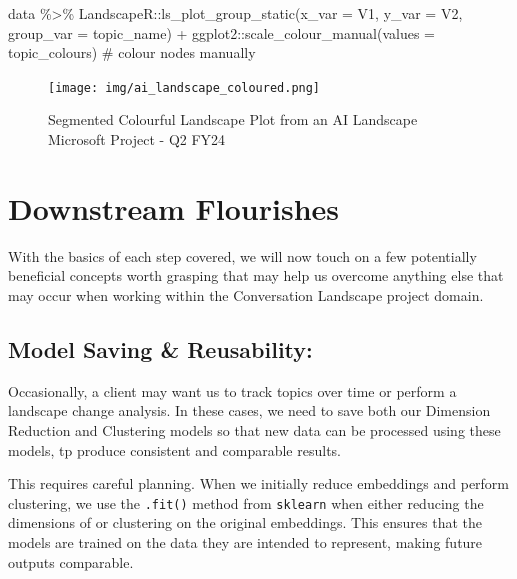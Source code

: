 \documentclass[
  letterpaper,
  DIV=11,
  numbers=noendperiod]{scrreprt}
\newenvironment{Shaded}{\begin{snugshade}}{\end{snugshade}}
\newcommand{\AttributeTok}[1]{\textcolor[rgb]{0.40,0.45,0.13}{#1}}
\newcommand{\CommentTok}[1]{\textcolor[rgb]{0.37,0.37,0.37}{#1}}
\newcommand{\FunctionTok}[1]{\textcolor[rgb]{0.28,0.35,0.67}{#1}}
\newcommand{\NormalTok}[1]{\textcolor[rgb]{0.00,0.23,0.31}{#1}}
\newcommand{\SpecialCharTok}[1]{\textcolor[rgb]{0.37,0.37,0.37}{#1}}
\begin{document}
\begin{Shaded}
\begin{Highlighting}[]
\NormalTok{data }\SpecialCharTok{\%\textgreater{}\%} 
\NormalTok{  LandscapeR}\SpecialCharTok{::}\FunctionTok{ls\_plot\_group\_static}\NormalTok{(}\AttributeTok{x\_var =}\NormalTok{ V1,}
                                   \AttributeTok{y\_var =}\NormalTok{ V2,}
                                   \AttributeTok{group\_var =}\NormalTok{ topic\_name) }\SpecialCharTok{+}
\NormalTok{  ggplot2}\SpecialCharTok{::}\FunctionTok{scale\_colour\_manual}\NormalTok{(}\AttributeTok{values =}\NormalTok{ topic\_colours) }\CommentTok{\# colour nodes manually}
\end{Highlighting}
\end{Shaded}

\begin{figure}[H]

{\centering \texttt{[image: img/ai\_landscape\_coloured.png]}

}

\caption{Segmented Colourful Landscape Plot from an AI Landscape
Microsoft Project - Q2 FY24}

\end{figure}%

\section{Downstream Flourishes}\label{downstream-flourishes}

With the basics of each step covered, we will now touch on a few
potentially beneficial concepts worth grasping that may help us overcome
anything else that may occur when working within the Conversation
Landscape project domain.

\subsection{Model Saving \&
Reusability:}\label{model-saving-reusability}

Occasionally, a client may want us to track topics over time or perform
a landscape change analysis. In these cases, we need to save both our
Dimension Reduction and Clustering models so that new data can be
processed using these models, tp produce consistent and comparable
results.

This requires careful planning. When we initially reduce embeddings and
perform clustering, we use the \texttt{.fit()} method from
\texttt{sklearn} when either reducing the dimensions of or clustering on
the original embeddings. This ensures that the models are trained on the
data they are intended to represent, making future outputs comparable.
\end{document}
